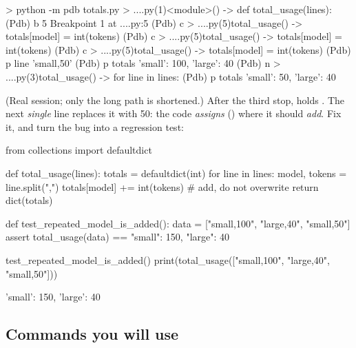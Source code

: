 \begin{rawcode}
> python -m pdb totals.py
> ...\totals.py(1)<module>()
-> def total_usage(lines):
(Pdb) b 5
Breakpoint 1 at ...\totals.py:5
(Pdb) c
> ...\totals.py(5)total_usage()
-> totals[model] = int(tokens)
(Pdb) c
> ...\totals.py(5)total_usage()
-> totals[model] = int(tokens)
(Pdb) c
> ...\totals.py(5)total_usage()
-> totals[model] = int(tokens)
(Pdb) p line
'small,50'
(Pdb) p totals
{'small': 100, 'large': 40}
(Pdb) n
> ...\totals.py(3)total_usage()
-> for line in lines:
(Pdb) p totals
{'small': 50, 'large': 40}
\end{rawcode}

(Real session; only the long path is shortened.) After the third stop,  holds . The next \emph{single} line
replaces it with 50: the code \emph{assigns} (\code{=}) where it should \emph{add}. Fix it, and turn the bug into a regression test:

\begin{pycode}
from collections import defaultdict


def total_usage(lines):
    totals = defaultdict(int)
    for line in lines:
        model, tokens = line.split(",")
        totals[model] += int(tokens)        # add, do not overwrite
    return dict(totals)


def test_repeated_model_is_added():
    data = ["small,100", "large,40", "small,50"]
    assert total_usage(data) == {"small": 150, "large": 40}


test_repeated_model_is_added()
print(total_usage(["small,100", "large,40", "small,50"]))
\end{pycode}
\begin{rawcode}
{'small': 150, 'large': 40}
\end{rawcode}

\subsection{Commands you will use}

